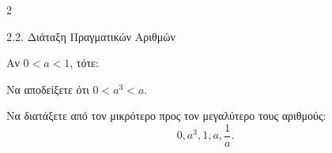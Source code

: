 \begin{ylh}{2}
    \item 2.2. Διάταξη Πραγματικών Αριθμών
\end{ylh}
Αν $0 < a < 1$, τότε:

\begin{alist}
\item Να αποδείξετε ότι $0 < a^3 < a$.
\item Να διατάξετε από τον μικρότερο προς τον μεγαλύτερο τους αριθμούς:
\[0, a^3, 1, a, \dfrac{1}{a}.\]
\end{alist}

